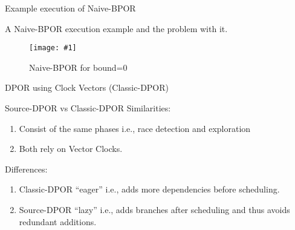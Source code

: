 \documentclass[9pt]{beamer}
\newcommand{\trace}[2]{
\begin{figure}[H]
\centering
\texttt{[image: \#1]}
\caption{#2}
\label{#2}
\end{figure}
}
\begin{document}
\begin{frame}{Example execution of Naive-BPOR}
    
A Naive-BPOR execution example and the problem with it.

\trace{../img/w2rvbound.pdf}{Naive-BPOR for bound=$0$}

\end{frame}

\begin{frame}{DPOR using Clock Vectors (Classic-DPOR)}

\begin{figure}
\end{figure}
\end{frame}

\begin{frame}{Source-DPOR vs Classic-DPOR}
Similarities:
\begin{enumerate}
    \item Consist of the same phases i.e., race detection and exploration
    \item Both rely on Vector Clocks.
\end{enumerate}

Differences:

\begin{enumerate}
    \item Classic-DPOR ``eager'' i.e., adds more dependencies before scheduling.
    \item Source-DPOR ``lazy'' i.e., adds branches after scheduling and thus avoids redundant additions.
\end{enumerate}

\end{frame}
\end{document}
